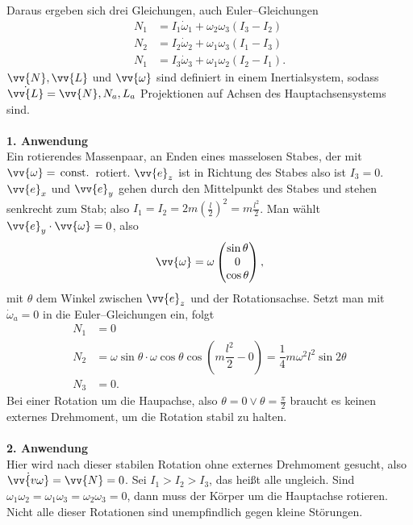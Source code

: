\documentclass[a4paper,12pt]{article}
\numberwithin{equation}{section}
\begin{document}
Daraus ergeben sich drei Gleichungen, auch Euler--Gleichungen
\begin{align*}
        N_1&=I_1\dot{\omega }_1+\omega _2\omega _3\left(I_3-I_2\right)\\
        N_2&=I_2\dot{\omega }_2+\omega _1\omega _3\left(I_1-I_3\right)\\
        N_1&=I_3\dot{\omega }_3+\omega _1\omega _2\left(I_2-I_1\right)
.\end{align*}
$\vv{N},\vv{L}$ und $\vv{\omega }$ sind definiert in einem Inertialsystem, sodass $\dot{\vv{L}}=\vv{N},N_a,L_a$ Projektionen auf Achsen des Hauptachsensystems sind.
\\\hfill\\\textbf{1. Anwendung}\\ 
Ein rotierendes Massenpaar, an Enden eines masselosen Stabes, der mit $\vv{\omega }=\,\text{const.}\,$ rotiert. $\vv{e}_z$ ist in Richtung des Stabes also ist $I_3=0$. $\vv{e}_x$ und $\vv{e}_y$ gehen durch den Mittelpunkt des Stabes und stehen senkrecht zum Stab; also $I_1=I_2=2m\left(\tfrac{l}{2}\right)^2=m\tfrac{l^2}{2}$. Man wählt $\vv{e}_y\cdot \vv{\omega }=0$, also
\[ 
        \vv{\omega }=\omega \begin{pmatrix}
                \sin \theta \\0\\\cos \theta 
        \end{pmatrix}
,\] 
mit $\theta $ dem Winkel zwischen $\vv{e}_z$ und der Rotationsachse. Setzt man mit $\dot{\omega }_a=0$ in die Euler--Gleichungen ein, folgt
\begin{align*}
        N_1&=0\\
        N_2&=\omega \sin \theta \cdot \omega \cos \theta \cos \left(m\dfrac{l^2}{2}-0\right)=\dfrac{1}{4}m\omega ^2l^2\sin 2\theta \\
        N_3&=0
.\end{align*}
Bei einer Rotation um die Haupachse, also $\theta =0\lor \theta =\tfrac{\pi }{2}$ braucht es keinen externes Drehmoment, um die Rotation stabil zu halten.
\\\hfill\\\textbf{2. Anwendung}\\ 
Hier wird nach dieser stabilen Rotation ohne externes Drehmoment gesucht, also $\dot{\vv{v\omega }}=\vv{N}=0$. Sei $I_1>I_2>I_3$, das heißt alle ungleich. Sind $\omega _1\omega _2=\omega _1\omega _3=\omega _2\omega _3=0$, dann muss der Körper um die Hauptachse rotieren. Nicht alle dieser Rotationen sind unempfindlich gegen kleine Störungen.\\\indent
\end{document}
